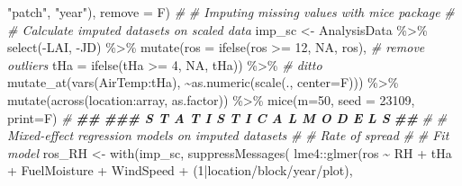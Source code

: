 \documentclass[
]{article}
\newenvironment{Shaded}{\begin{snugshade}}{\end{snugshade}}
\newcommand{\AttributeTok}[1]{\textcolor[rgb]{0.77,0.63,0.00}{#1}}
\newcommand{\CommentTok}[1]{\textcolor[rgb]{0.56,0.35,0.01}{\textit{#1}}}
\newcommand{\ConstantTok}[1]{\textcolor[rgb]{0.00,0.00,0.00}{#1}}
\newcommand{\DecValTok}[1]{\textcolor[rgb]{0.00,0.00,0.81}{#1}}
\newcommand{\DocumentationTok}[1]{\textcolor[rgb]{0.56,0.35,0.01}{\textbf{\textit{#1}}}}
\newcommand{\FunctionTok}[1]{\textcolor[rgb]{0.00,0.00,0.00}{#1}}
\newcommand{\NormalTok}[1]{#1}
\newcommand{\OtherTok}[1]{\textcolor[rgb]{0.56,0.35,0.01}{#1}}
\newcommand{\SpecialCharTok}[1]{\textcolor[rgb]{0.00,0.00,0.00}{#1}}
\newcommand{\StringTok}[1]{\textcolor[rgb]{0.31,0.60,0.02}{#1}}
\begin{document}
\begin{Shaded}
\begin{Highlighting}[]
                           \StringTok{"patch"}\NormalTok{, }\StringTok{"year"}\NormalTok{), }
               \AttributeTok{remove =}\NormalTok{ F)}
\CommentTok{\#}
\CommentTok{\# Imputing missing values with mice package}
\CommentTok{\#}
  \CommentTok{\# Calculate imputed datasets on scaled data}
\NormalTok{    imp\_sc }\OtherTok{\textless{}{-}}\NormalTok{ AnalysisData }\SpecialCharTok{\%\textgreater{}\%} 
            \FunctionTok{select}\NormalTok{(}\SpecialCharTok{{-}}\NormalTok{LAI, }\SpecialCharTok{{-}}\NormalTok{JD) }\SpecialCharTok{\%\textgreater{}\%}
            \FunctionTok{mutate}\NormalTok{(}\AttributeTok{ros =} \FunctionTok{ifelse}\NormalTok{(ros }\SpecialCharTok{\textgreater{}=} \DecValTok{12}\NormalTok{, }\ConstantTok{NA}\NormalTok{, ros),    }\CommentTok{\# remove outliers}
                   \AttributeTok{tHa =} \FunctionTok{ifelse}\NormalTok{(tHa }\SpecialCharTok{\textgreater{}=} \DecValTok{4}\NormalTok{, }\ConstantTok{NA}\NormalTok{, tHa)) }\SpecialCharTok{\%\textgreater{}\%} \CommentTok{\# ditto}
            \FunctionTok{mutate\_at}\NormalTok{(}\FunctionTok{vars}\NormalTok{(AirTemp}\SpecialCharTok{:}\NormalTok{tHa), }\SpecialCharTok{\textasciitilde{}}\FunctionTok{as.numeric}\NormalTok{(}\FunctionTok{scale}\NormalTok{(., }\AttributeTok{center=}\NormalTok{F))) }\SpecialCharTok{\%\textgreater{}\%}
                      \FunctionTok{mutate}\NormalTok{(}\FunctionTok{across}\NormalTok{(location}\SpecialCharTok{:}\NormalTok{array, as.factor)) }\SpecialCharTok{\%\textgreater{}\%}
                       \FunctionTok{mice}\NormalTok{(}\AttributeTok{m=}\DecValTok{50}\NormalTok{, }\AttributeTok{seed =} \DecValTok{23109}\NormalTok{, }\AttributeTok{print=}\NormalTok{F)}
\CommentTok{\#}
\DocumentationTok{\#\#}
\DocumentationTok{\#\#\#  S T A T I S T I C A L   M O D E L S}
\DocumentationTok{\#\#}
\CommentTok{\#}
\CommentTok{\# Mixed{-}effect regression models on imputed datasets}
\CommentTok{\#}
\CommentTok{\# Rate of spread}
\CommentTok{\#   }
  \CommentTok{\# Fit model }
\NormalTok{    ros\_RH }\OtherTok{\textless{}{-}} 
      \FunctionTok{with}\NormalTok{(imp\_sc, }\FunctionTok{suppressMessages}\NormalTok{(}
\NormalTok{            lme4}\SpecialCharTok{::}\FunctionTok{glmer}\NormalTok{(ros }\SpecialCharTok{\textasciitilde{}}\NormalTok{ RH }\SpecialCharTok{+}\NormalTok{ tHa }\SpecialCharTok{+}
\NormalTok{                              FuelMoisture }\SpecialCharTok{+}\NormalTok{ WindSpeed }\SpecialCharTok{+}
\NormalTok{                              (}\DecValTok{1}\SpecialCharTok{|}\NormalTok{location}\SpecialCharTok{/}\NormalTok{block}\SpecialCharTok{/}\NormalTok{year}\SpecialCharTok{/}\NormalTok{plot), }

\end{Highlighting}
\end{Shaded}
\end{document}

